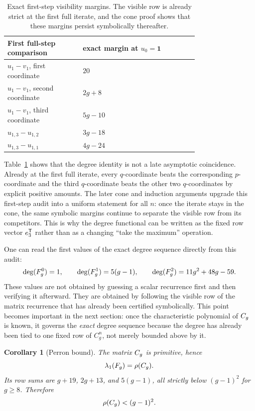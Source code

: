 \documentclass[11pt]{article}
\newtheorem{corollary}[theorem]{Corollary}
\theoremstyle{remark}
\numberwithin{equation}{section}
\begin{document}
\begin{table}[t]
\centering
\small
\begin{tabular}{p{0.30\linewidth}p{0.46\linewidth}}
\toprule
First full-step comparison & exact margin at \(u_0=\mathbf 1\) \\
\midrule
\(u_1-v_1\), first coordinate & \(20\) \\
\(u_1-v_1\), second coordinate & \(2g+8\) \\
\(u_1-v_1\), third coordinate & \(5g-10\) \\
\(u_{1,3}-u_{1,2}\) & \(3g-18\) \\
\(u_{1,3}-u_{1,1}\) & \(4g-24\) \\
\bottomrule
\end{tabular}
\caption{Exact first-step visibility margins.  The visible row is already strict at the first full iterate, and the cone proof shows that these margins persist symbolically thereafter.}
\label{tab:degreeaudit}
\end{table}

Table~\ref{tab:degreeaudit} shows that the degree identity is not a late
asymptotic coincidence.  Already at the first full iterate, every
\(q\)-coordinate beats the corresponding \(p\)-coordinate and the third
\(q\)-coordinate beats the other two \(q\)-coordinates by explicit positive
amounts.  The later cone and induction arguments upgrade this first-step audit
into a uniform statement for all \(n\): once the iterate stays in the cone, the
same symbolic margins continue to separate the visible row from its
competitors.  This is why the degree functional can be written as the fixed row
vector \(e_3^{\mathsf T}\) rather than as a changing ``take the maximum''
operation.

One can read the first values of the exact degree sequence directly from this
audit:
\[
\operatorname{deg}(F_g^0)=1,\qquad
\operatorname{deg}(F_g^1)=5(g-1),\qquad
\operatorname{deg}(F_g^2)=11g^2+48g-59.
\]
These values are not obtained by guessing a scalar recurrence first and then
verifying it afterward.  They are obtained by following the visible row of the
matrix recurrence that has already been certified symbolically.  This point
becomes important in the next section: once the characteristic polynomial of
\(C_g\) is known, it governs the \emph{exact} degree sequence because the
degree has already been tied to one fixed row of \(C_g^n\), not merely bounded
above by it.

\begin{corollary}[Perron bound]\label{cor:perron}
The matrix \(C_g\) is primitive, hence
\[
\lambda_1(F_g)=\rho(C_g).
\]
Its row sums are \(g+19\), \(2g+13\), and \(5(g-1)\), all strictly below
\((g-1)^2\) for \(g\geq 8\).  Therefore
\[
\rho(C_g)<(g-1)^2.
\]
\end{corollary}
\end{document}
